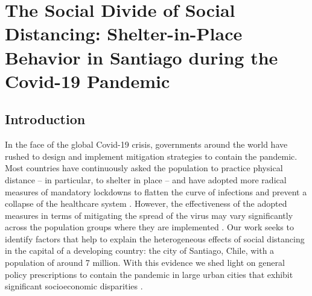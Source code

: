 \chapter{The Social Divide of Social Distancing: Shelter-in-Place Behavior in Santiago during the Covid-19 Pandemic}

\section{Introduction}
In the face of the global Covid-19 crisis, governments around the world have rushed to design and implement mitigation strategies to contain the pandemic. Most countries have continuously asked the population to practice physical distance -- in particular, to shelter in place -- and have adopted more radical measures of mandatory lockdowns
to  flatten the curve of infections and prevent a collapse of the healthcare system \citep{hsiang2020effect}. However, the effectiveness of the adopted measures in terms of mitigating the spread of the virus may vary significantly across the population groups where they are implemented \citep{allcott2020polarization,lamb2021differential}. Our work seeks to identify factors that help to explain the heterogeneous effects of social distancing  in the capital of  a developing country:  the city of Santiago, Chile, with a population of around 7 million. With this evidence we shed light on general policy prescriptions to contain the pandemic in large urban cities that exhibit significant socioeconomic  disparities \citep{florida2017new}.

